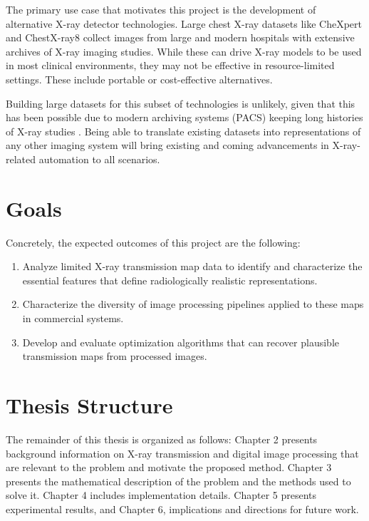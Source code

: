 \documentclass[nomenclature, english, bibtex]{kththesis}
\numberwithin{listing}{chapter}
\begin{document}
The primary use case that motivates this project is the development of alternative X-ray detector technologies.
Large chest X-ray datasets like CheXpert \cite{chexpert} and ChestX-ray8 \cite{nih} collect images from large
and modern hospitals with extensive archives of X-ray imaging studies. While these can drive X-ray models to be
used in most clinical environments, they may not be effective in resource-limited settings. These include portable
or cost-effective alternatives.

Building large datasets for this subset of technologies is unlikely, given that this has been possible due to
modern archiving systems (PACS) keeping long histories of X-ray studies \cite[p.~3462]{nih}. Being able
to translate existing datasets into representations of any other imaging system will bring existing and
coming advancements in X-ray-related automation to all scenarios.

\section{Goals}

Concretely, the expected outcomes of this project are the following:

\begin{enumerate}
    \item Analyze limited X-ray transmission map data to identify and characterize the essential features that define
    radiologically realistic representations.
    \item Characterize the diversity of image processing pipelines applied to these maps in commercial systems.
    \item Develop and evaluate optimization algorithms that can recover plausible transmission maps from processed images.
\end{enumerate}

\section{Thesis Structure}

The remainder of this thesis is organized as follows: Chapter 2 presents background information on X-ray transmission and
digital image processing that are relevant to the problem and motivate the proposed method. Chapter 3
presents the mathematical description of the problem and the methods used to solve it. Chapter 4 includes implementation
details. Chapter 5 presents experimental results, and Chapter 6, implications
and directions for future work.
\end{document}
